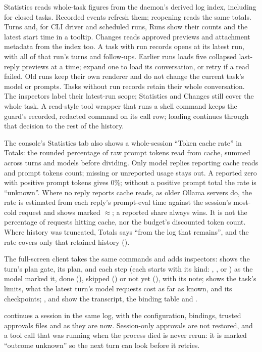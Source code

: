 Statistics reads whole-task figures from the daemon's derived log index,
including for closed tasks. Recorded events refresh them; reopening reads the
same totals. Turns and, for CLI driver and scheduled runs, Runs show their counts and the
latest start time in a tooltip. Changes reads approved previews and attachment
metadata from the index too. A task with run records opens at its latest run, with all of that run's turns
and follow-ups. Earlier runs loads five collapsed last-reply previews at a
time; expand one to load its conversation, or retry if a read failed. Old runs
keep their own renderer and do not change the current task's model or prompts.
Tasks without run records retain their whole conversation. The inspectors
label their latest-run scope; Statistics and Changes still cover the whole
task. A read-style tool wrapper that runs a shell
command keeps the guard's recorded, redacted command on its call row;
loading continues through that decision to the rest of the history.

The console's Statistics tab also shows a whole-session ``Token cache rate'' in
Totals: the rounded percentage of raw prompt tokens read from cache, summed
across turns and models before dividing. Only model replies reporting cache
reads and prompt tokens count; missing or unreported usage stays out. A
reported zero with positive prompt tokens gives 0\%; without a positive
prompt total the rate is ``unknown''. Where no reply reports cache reads,
as older Ollama servers do, the rate is estimated from each reply's prompt-eval
time against the session's most-cold request and shows marked $\approx$;
a reported share always wins. It is not the percentage of requests
hitting cache, nor the budget's discounted token count. Where history was
truncated, Totals says ``from the log that remains'', and the rate covers
only that retained history ().

The full-screen client takes the same commands and adds inspectors:
 shows the turn's plan gate, its plan, and each step (each
starts with its kind: , ,  or
) as the model marked it, done (\code{[x]}), skipped (\code{[-]}) or not yet
(\code{[ ]}), with its note;  shows the task's limits,
what the latest turn's model requests cost as far as known, and its
checkpoints; ,  and  show
the transcript, the binding table and .

 continues a session in the same log, with the
configuration, bindings, trusted approvals files and  as they are
now. Session-only approvals are not restored, and a tool call that was
running when the process died is never rerun: it is marked ``outcome
unknown'' so the next turn can look before it retries.

